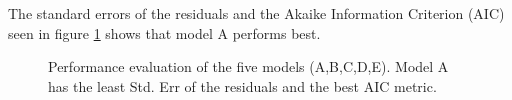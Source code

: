 \documentclass[a4paper,10pt]{article}
\begin{document}
The standard errors of the residuals and the Akaike Information Criterion (AIC) seen in figure \ref{fig:modperf} shows that model A performs best.
\begin{figure}[ht]
\centering
  \qquad
  \caption{Performance evaluation of the five models (A,B,C,D,E). Model A has the least Std. Err of the residuals and the best AIC metric.}
\label{fig:modperf}
\end{figure}
\end{document}
